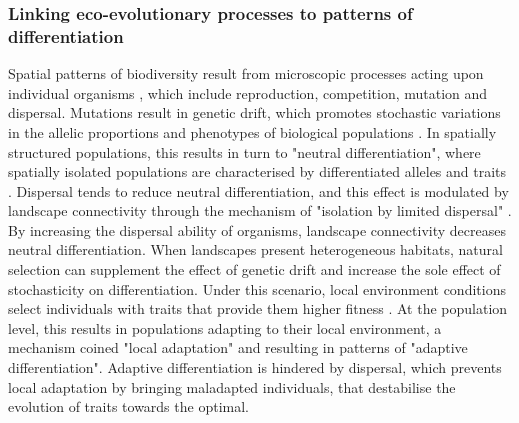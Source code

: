 \subsubsection{Linking eco-evolutionary processes to patterns of differentiation}
Spatial patterns of biodiversity result from microscopic processes acting upon individual organisms \citep{Champagnat2006}, which include reproduction, competition, mutation and dispersal.
% 
Mutations result in genetic drift, which promotes stochastic variations in the allelic proportions and phenotypes of biological populations \xxx. In spatially structured populations, this results in turn to "neutral differentiation", where spatially isolated populations are characterised by differentiated alleles and traits \xxx. 
% 
Dispersal tends to reduce neutral differentiation, and this effect is modulated by landscape connectivity \citep{Wright1943,McRae2006,McRae2007} through the mechanism of "isolation by limited dispersal" \citep{Orsini2013}. By increasing the dispersal ability of organisms, landscape connectivity decreases neutral differentiation.
% 
When landscapes present heterogeneous habitats, natural selection can supplement the effect of genetic drift and increase the sole effect of stochasticity on differentiation. Under this scenario, local environment conditions select individuals with traits that provide them higher fitness \xxx. At the population level, this results in populations adapting to their local environment, a mechanism coined "local adaptation" \citep{Kawecki2004} and resulting in patterns of "adaptive differentiation". 
% 
% 
Adaptive differentiation is hindered by dispersal, which prevents local adaptation by bringing maladapted individuals, that destabilise the evolution of traits towards the optimal.
% 
% 
